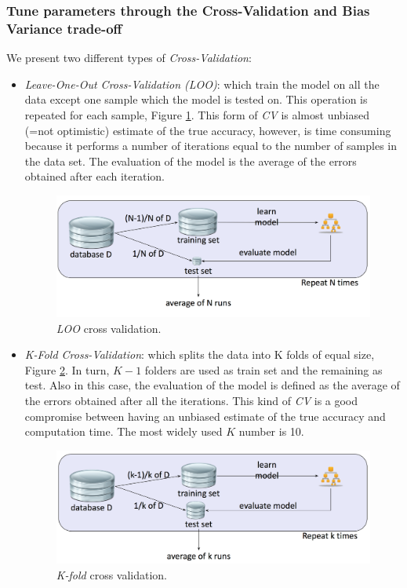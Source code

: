 \subsubsection{Tune parameters through the Cross-Validation and Bias Variance trade-off}

We present two different types of \emph{Cross-Validation}:
\begin{itemize}
\item \emph{Leave-One-Out Cross-Validation (LOO)}: which train the model on all the data except one sample which the model is tested on. This operation is repeated for each sample, Figure \ref{pic:loo}. This form of \emph{CV}  is almost unbiased (=not optimistic) estimate of the true accuracy, however, is time consuming because it performs a number of iterations equal to the number of samples in the data set. The evaluation of the model is the average of the errors obtained after each iteration.

\begin{figure}[H]%
 \centering
 \includegraphics[width=13cm]{./img/08/loo}
 \caption{\label{pic:loo} \emph{LOO} cross validation.}
\end{figure}

\item \emph{K-Fold Cross-Validation}: which splits the data into K folds of equal size, Figure \ref{pic:kfold}. In turn, $K-1$ folders are used as train set and the remaining as test. Also in this case, the evaluation of the model is defined as the average of the errors obtained after all the iterations. This kind of \emph{CV} is a good compromise between having an unbiased estimate of the true accuracy and computation time. The most widely used $K$ number is 10.

\begin{figure}[H]%
 \centering
 \includegraphics[width=13cm]{./img/08/kfold}
 \caption{\label{pic:kfold} \emph{K-fold} cross validation.}
\end{figure}

\end{itemize}

